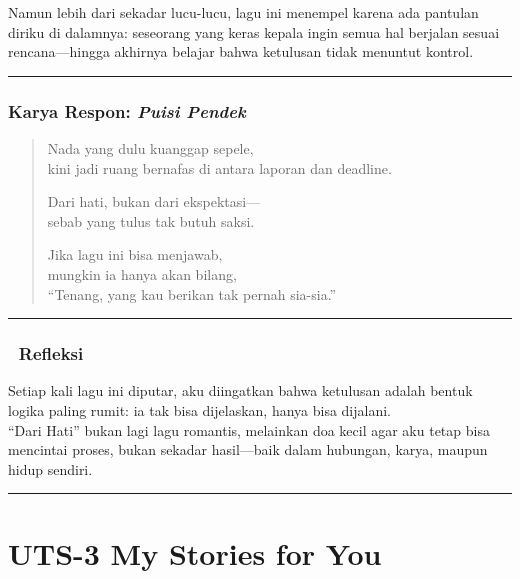 \documentclass[
  letterpaper,
  DIV=11,
  numbers=noendperiod]{scrreprt}
\begin{document}
Namun lebih dari sekadar lucu-lucu, lagu ini menempel karena ada
pantulan diriku di dalamnya: seseorang yang keras kepala ingin semua hal
berjalan sesuai rencana---hingga akhirnya belajar bahwa ketulusan tidak
menuntut kontrol.

\begin{center}\rule{0.5\linewidth}{0.5pt}\end{center}

\subsection{\texorpdfstring{Karya Respon: \emph{Puisi
Pendek}}{Karya Respon: Puisi Pendek}}\label{karya-respon-puisi-pendek}

\begin{quote}
Nada yang dulu kuanggap sepele,\\
kini jadi ruang bernafas di antara laporan dan deadline.

Dari hati, bukan dari ekspektasi---\\
sebab yang tulus tak butuh saksi.

Jika lagu ini bisa menjawab,\\
mungkin ia hanya akan bilang,\\
``Tenang, yang kau berikan tak pernah sia-sia.''
\end{quote}

\begin{center}\rule{0.5\linewidth}{0.5pt}\end{center}

\subsection{💭 Refleksi}\label{refleksi}

Setiap kali lagu ini diputar, aku diingatkan bahwa ketulusan adalah
bentuk logika paling rumit: ia tak bisa dijelaskan, hanya bisa
dijalani.\\
``Dari Hati'' bukan lagi lagu romantis, melainkan doa kecil agar aku
tetap bisa mencintai proses, bukan sekadar hasil---baik dalam hubungan,
karya, maupun hidup sendiri.

\begin{center}\rule{0.5\linewidth}{0.5pt}\end{center}


\chapter{UTS-3 My Stories for You}\label{uts-3-my-stories-for-you}
\end{document}
